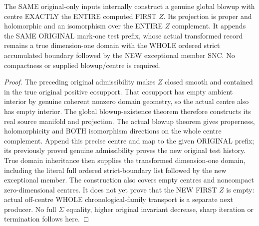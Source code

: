 \begin{theorem}
\label{hir:sharp-original-curve-whole-first-defect-global-blowup}
\leanok
The SAME original-only inputs internally construct a genuine global
blowup with centre EXACTLY the ENTIRE computed FIRST $Z$. Its projection
is proper and holomorphic and an isomorphism over the ENTIRE $Z$
complement. It appends the SAME ORIGINAL mark-one test prefix, whose
actual transformed record remains a true dimension-one domain with the
WHOLE ordered strict accumulated boundary followed by the NEW exceptional
member SNC. No compactness or supplied blowup/centre is required.
\end{theorem}
\begin{proof}
The preceding original admissibility makes $Z$ closed smooth and contained
in the true original positive cosupport. That cosupport has empty ambient
interior by genuine coherent nonzero domain geometry, so the actual
centre also has empty interior. The global blowup-existence theorem
therefore constructs its real source manifold and projection. The actual
blowup theorem gives properness, holomorphicity and BOTH isomorphism
directions on the whole centre complement. Append this precise centre
and map to the given ORIGINAL prefix; its previously proved genuine
admissibility proves the new original test history. True domain
inheritance then supplies the transformed dimension-one domain, including
the literal full ordered strict-boundary list followed by the new
exceptional member. The construction also covers empty centres and
noncompact zero-dimensional centres. It does not yet prove that the NEW
FIRST $Z$ is empty: actual off-centre WHOLE chronological-family transport
is a separate next producer. No full $\Sigma$ equality, higher original
invariant decrease, sharp iteration or termination follows here.
\end{proof}
